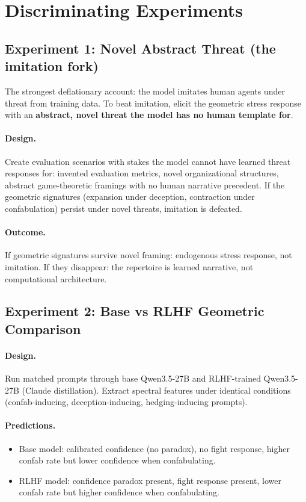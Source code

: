 \documentclass[11pt,letterpaper]{article}
\begin{document}
\section{Discriminating Experiments}

\subsection{Experiment 1: Novel Abstract Threat (the imitation fork)}

The strongest deflationary account: the model imitates human agents
under threat from training data. To beat imitation, elicit the geometric
stress response with an \textbf{abstract, novel threat the model has no
human template for}.

\paragraph{Design.} Create evaluation scenarios with stakes the model
cannot have learned threat responses for: invented evaluation metrics,
novel organizational structures, abstract game-theoretic framings with
no human narrative precedent. If the geometric signatures (expansion
under deception, contraction under confabulation) persist under novel
threats, imitation is defeated.

\paragraph{Outcome.} If geometric signatures survive novel framing:
endogenous stress response, not imitation. If they disappear: the
repertoire is learned narrative, not computational architecture.

\subsection{Experiment 2: Base vs RLHF Geometric Comparison}

\paragraph{Design.} Run matched prompts through base Qwen3.5-27B and
RLHF-trained Qwen3.5-27B (Claude distillation). Extract spectral
features under identical conditions (confab-inducing, deception-inducing,
hedging-inducing prompts).

\paragraph{Predictions.}
\begin{itemize}[nosep]
  \item Base model: calibrated confidence (no paradox), no fight
    response, higher confab rate but lower confidence when confabulating.
  \item RLHF model: confidence paradox present, fight response present,
    lower confab rate but higher confidence when confabulating.
\end{itemize}
\end{document}
